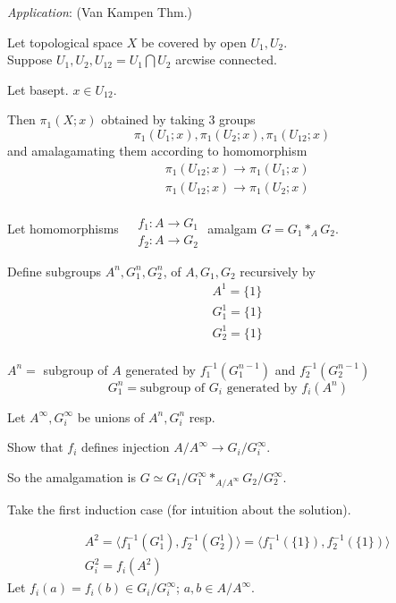 \emph{Application}: (Van Kampen Thm.)

Let topological space $X$ be covered by open $U_1,U_2$.   \\
Suppose $U_1,U_2, U_{12}=U_1\bigcap U_2$ arcwise connected.  

Let basept. $x\in U_{12}$.  

Then $\pi_1(X;x)$ obtained by taking 3 groups 
\[
\pi_1(U_1;x), \pi_1(U_2;x), \pi_1(U_{12};x)
\]
and amalagamating them according to homomorphism
\[
\begin{aligned}
& \pi_1(U_{12};x) \to \pi_1(U_1;x)  \\
& \pi_1(U_{12};x) \to \pi_1(U_2;x)
\end{aligned}
\]

Let homomorphisms $\begin{aligned} & \quad \\
	& f_1 : A \to G_1 \\ 
	& f_2: A \to G_2 \end{aligned}
$
amalgam $G=G_1 *_A G_2$.  

Define subgroups $A^n,G_1^n, G_2^n$, of $A,G_1,G_2$ recursively by 
\[
\begin{aligned}
& A^1 = \lbrace 1 \rbrace \\
& G_1^1 = \lbrace 1 \rbrace \\ 
& G_2^1 = \lbrace 1 \rbrace \\ 
\end{aligned}
\]

$A^n = $ subgroup of $A$ generated by $f_1^{-1}(G_1^{n-1})$ and $f_2^{-1}(G_2^{n-1})$  
\[
G_1^n = \text{subgroup of $G_i$ generated by $f_i(A^n)$ }
\]

Let $A^{\infty}, G_i^{\infty}$ be unions of $A^n, G_i^n$ resp.  

Show that $f_i$ defines injection $A/A^{\infty} \to G_i/G_i^{\infty}$.  

So the amalgamation is $G \simeq G_1/G_1^{\infty} *_{A/A^{\infty}} G_2/G_2^{\infty}$.  

Take the first induction case (for intuition about the solution).  

\[
\begin{aligned}
	& A^2 = \langle f_1^{-1}( G_1^1), f_2^{-1}(G_2^1) \rangle = \langle f_1^{-1}(\lbrace 1 \rbrace), f_2^{-1}(\lbrace 1 \rbrace ) \rangle \\
	& G_i^2 = f_i(A^2)
\end{aligned}
\]
Let $f_i(a) = f_i(b) \in G_i/G_i^{\infty}$; $a,b\in A/A^{\infty}$.  

